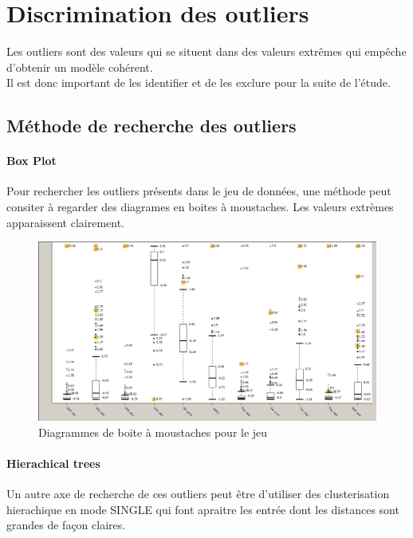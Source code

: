 \section{Discrimination des outliers}
Les outliers sont des valeurs qui se situent dans des valeurs extrêmes qui empêche d'obtenir un modèle cohérent.\\
Il est donc important de les identifier et de les exclure pour la suite de l'étude.

\subsection{Méthode de recherche des outliers}

\paragraph{Box Plot}
Pour rechercher les outliers présents dans le jeu de données, une méthode peut consiter à regarder des diagrames en boites à moustaches.
Les valeurs extrèmes apparaissent clairement.

\begin{figure}[H]
	\begin{center}
		\includegraphics[scale=0.5]{Image/BoxplotOutlierNoMissing2}
		\caption{Diagrammes de boite à moustaches pour le jeu \jeuc}
	\end{center}
\end{figure}

\paragraph{Hierachical trees}
Un autre axe de recherche de ces outliers peut être d'utiliser des clusterisation hierachique en mode SINGLE qui font apraitre les entrée dont les distances sont grandes de façon claires.


